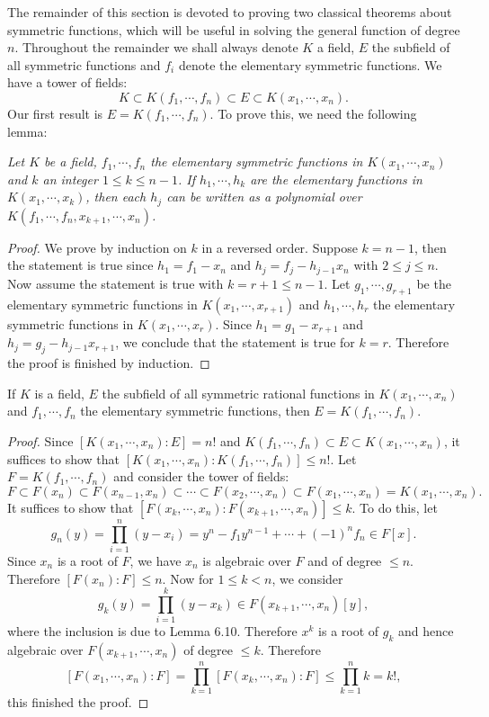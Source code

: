 The remainder of this section is devoted to proving two classical theorems about symmetric functions, which will be useful in solving the general function of degree $n$. Throughout the remainder we shall always denote $K$ a field, $E$ the subfield of all symmetric functions and $f_i$ denote the elementary symmetric functions. We have a tower of fields: 
$$
K\subset K\left( f_1,\cdots ,f_n \right) \subset E\subset K\left( x_1,\cdots ,x_n \right) .
$$
Our first result is $E=K(f_1,\cdots,f_n)$. To prove this, we need the following lemma: 
\begin{lemma}\em
Let $K$ be a field, $f_1,\cdots,f_n$ the elementary symmetric functions in $K(x_1,\cdots,x_n)$ and $k$ an integer $1\le k\le n-1$. If $h_1,\cdots,h_k$ are the elementary functions in $K(x_1,\cdots,x_k)$, then each $h_j$ can be written as a polynomial over $K(f_1,\cdots,f_n,x_{k+1},\cdots,x_n)$.
\end{lemma}
\begin{proof}
We prove by induction on $k$ in a reversed order. Suppose $k=n-1$, then the statement is true since $h_1=f_1-x_n$ and $h_j=f_j-h_{j-1}x_n$ with $2\le j\le n$. Now assume the statement is true with $k=r+1\le n-1$. Let $g_1,\cdots,g_{r+1}$ be the elementary symmetric functions in $K(x_1,\cdots,x_{r+1})$ and $h_1,\cdots,h_r$ the elementary symmetric functions in $K(x_1,\cdots,x_r)$. Since $h_1=g_1-x_{r+1}$ and $h_j=g_j-h_{j-1}x_{r+1}$, we conclude that the statement is true for $k=r$. Therefore the proof is finished by induction.
\end{proof}
\begin{theorem}
If $K$ is a field, $E$ the subfield of all symmetric rational functions in $K(x_1,\cdots,x_n)$ and $f_1,\cdots,f_n$ the elementary symmetric functions, then $E=K(f_1,\cdots,f_n)$.
\end{theorem}
\begin{proof}
Since $[K(x_1,\cdots,x_n):E]=n!$ and $K(f_1,\cdots,f_n)\subset E\subset K(x_1,\cdots,x_n)$, it suffices to show that $[K(x_1,\cdots,x_n):K(f_1,\cdots,f_n)]\le n!$. Let $F=K(f_1,\cdots,f_n)$ and consider the tower of fields: 
$$
F\subset F\left( x_n \right) \subset F\left( x_{n-1},x_n \right) \subset \cdots \subset F\left( x_2,\cdots ,x_n \right) \subset F\left( x_1,\cdots ,x_n \right) =K\left( x_1,\cdots ,x_n \right) .
$$
It suffices to show that $[F(x_k,\cdots,x_n):F(x_{k+1},\cdots,x_n)]\le k$. To do this, let 
$$
g_n\left( y \right) =\prod_{i=1}^n{\left( y-x_i \right)}=y^n-f_1y^{n-1}+\cdots +\left( -1 \right) ^nf_n\in F\left[ x \right] .
$$
Since $x_n$ is a root of $F$, we have $x_n$ is algebraic over $F$ and of degree $\le n$. Therefore $[F(x_n):F]\le n$. Now for $1\le k<n$, we consider 
$$
g_k\left( y \right) =\prod_{i=1}^k{\left( y-x_k \right)}\in F\left( x_{k+1},\cdots ,x_n \right) \left[ y \right] ,
$$
where the inclusion is due to Lemma 6.10. Therefore $x^k$ is a root of $g_k$ and hence algebraic over $F(x_{k+1},\cdots,x_n)$ of degree $\le k$. Therefore 
$$
\left[ F\left( x_1,\cdots ,x_n \right) :F \right] =\prod_{k=1}^n{\left[ F\left( x_k,\cdots ,x_n \right) :F \right]}\le \prod_{k=1}^n{k}=k!,
$$
this finished the proof.
\end{proof}
